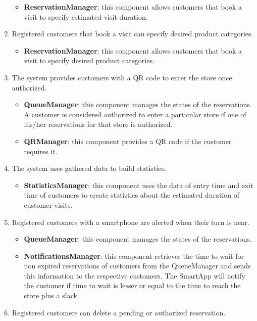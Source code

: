 \begin{enumerate}[label=R\arabic*]
	\begin{itemize}
		\item \textbf{ReservationManager}: this component allows customers that book a visit to specify estimated visit duration.
	\end{itemize}
	\item Registered customers that book a visit can specify desired product categories.
	\begin{itemize}
		\item \textbf{ReservationManager}: this component allows customers that book a visit to specify desired product categories.
	\end{itemize}
	\item The system provides customers with a QR code to enter the store once authorized.
	\begin{itemize}
		\item \textbf{QueueManager}: this component manages the states of the reservations. A customer is considered authorized to enter a particular store if one of his/her reservations for that store is authorized.
		\item \textbf{QRManager}: this component provides a QR code if the customer requires it.
	\end{itemize}
	\item The system uses gathered data to build statistics.
	\begin{itemize}
		\item \textbf{StatisticsManager}: this component uses the data of entry time and exit time of customers to create statistics about the estimated duration of customer visits.
	\end{itemize}
	\item Registered customers with a smartphone are alerted when their turn is near.
	\begin{itemize}
		\item \textbf{QueueManager}: this component manages the states of the reservations.
		\item \textbf{NotificationsManager}: this component retrieves the time to wait for non expired reservations of customers from the QueueManager and sends this information to the respective customers. The SmartApp will notify the customer if time to wait is lesser or equal to the time to reach the store plus a slack.
	\end{itemize}
	\item Registered customers can delete a pending or authorized reservation.
	\begin{itemize}

\end{itemize}
\end{enumerate}
